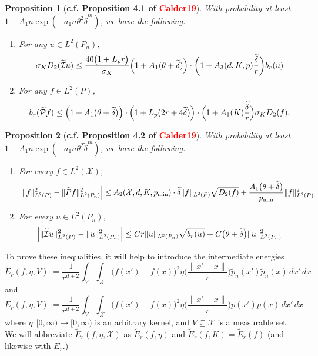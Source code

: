 \documentclass{article}
\newcommand{\1}{\mathbf{1}}
\newcommand{\Xset}{\mathcal{X}}
\newcommand{\Leb}{L}
\newcommand{\mc}[1]{\mathcal{#1}}
\newcommand{\wt}[1]{\widetilde{#1}}
\theoremstyle{alden}
\theoremstyle{aldenthm}
\newtheorem{proposition}{Proposition}
\theoremstyle{definition}
\theoremstyle{remark}
\begin{document}
\begin{proposition}[\textbf{c.f. Proposition 4.1 of \textcolor{red}{Calder19}}]
	\label{prop:dirichlet_energies}
	With probability at least $1 - A_1n\exp(-a_1n\theta^2\wt{\delta}^{m})$, we have the following.
	\begin{enumerate}[(1)]
		\item For any $u \in \Leb^2(P_n)$,
		\begin{equation*}
		\sigma_{K} D_2(\wt{\mc{I}}u) \leq \frac{40 \bigl(1 + L_p r\bigr)}{\sigma_K} \Bigl(1 + A_1(\theta + \wt{\delta})\Bigr) \cdot \biggl(1 + A_3(d,K,p)\frac{\wt{\delta}}{r}\biggr) b_r(u)
		\end{equation*}
		\item For any $f \in \Leb^2(P)$,
		\begin{equation*}
		b_r(\wt{\mc{P}}f) \leq \Bigl(1 + A_1(\theta + \wt{\delta})\Bigr) \cdot \Bigl(1 + L_p(2r + 4\wt{\delta})\Bigr) \cdot \Bigl(1 + A_1(K)\frac{\wt{\delta}}{r}\Bigr) \sigma_{K} D_2(f).
		\end{equation*}
	\end{enumerate}
\end{proposition}

\begin{proposition}[\textbf{c.f. Proposition 4.2 of \textcolor{red}{Calder19}}]
	\label{prop:isometry}
	With probability at least $1 - A_1n\exp(-a_1n\theta^2\wt{\delta}^{m})$, we have the following.
	\begin{enumerate}[(1)]
		\item For every $f \in \Leb^2(\Xset)$,
		\begin{equation*}
		\Bigl|\|f\|_{\Leb^2(P)}^2 - \|\wt{P}f\|_{\Leb^2(P_n)}^2\Bigr| \leq A_2(\Xset,d,K,p_{\min}) \cdot \wt{\delta} \|f\|_{\Leb^2(P)} \sqrt{D_2(f)} + \frac{A_1\bigl(\theta + \wt{\delta}\bigr)}{p_{\min}} \|f\|_{\Leb^2(P)}^2
		\end{equation*}
		\item For every $u \in \Leb^2(P_n)$,
		\begin{equation*}
		\Bigl|\|\wt{\mc{I}}u\|_{\Leb^2(P)}^2 - \|u\|_{\Leb^2(P_n)}^2\Bigr| \leq C r \|u\|_{\Leb^2(P_n)} \sqrt{b_r(u)} + C\bigl(\theta + \wt{\delta}\bigr) \|u\|_{\Leb^2(P_n)}^2
		\end{equation*}
	\end{enumerate}
\end{proposition}

To prove these inequalities, it will help to introduce the intermediate energies
\begin{equation*}
\wt{E}_r(f,\eta,V) := \frac{1}{r^{d + 2}}\int_{V} \int_{\Xset} \bigl(f(x') - f(x)\bigr)^2 \eta\biggl(\frac{\|x' - x\|}{r}\biggr) \wt{p}_n(x') \wt{p}_n(x) \,dx' \,dx
\end{equation*}
and
\begin{equation*}
{E}_r(f,\eta,V) := \frac{1}{r^{d + 2}}\int_{V} \int_{\Xset} \bigl(f(x') - f(x)\bigr)^2 \eta\biggl(\frac{\|x' - x\|}{r}\biggr) p(x') p(x) \,dx' \,dx
\end{equation*}
where $\eta: [0,\infty) \to [0,\infty)$ is an arbitrary kernel, and $V \subseteq \Xset$ is a measurable set. We will abbreviate $\wt{E}_r(f,\eta,\Xset)$ as $\wt{E}_r(f,\eta)$ and $\wt{E}_r(f,K) = \wt{E}_r(f)$ (and likewise with $E_r$.)
\end{document}
